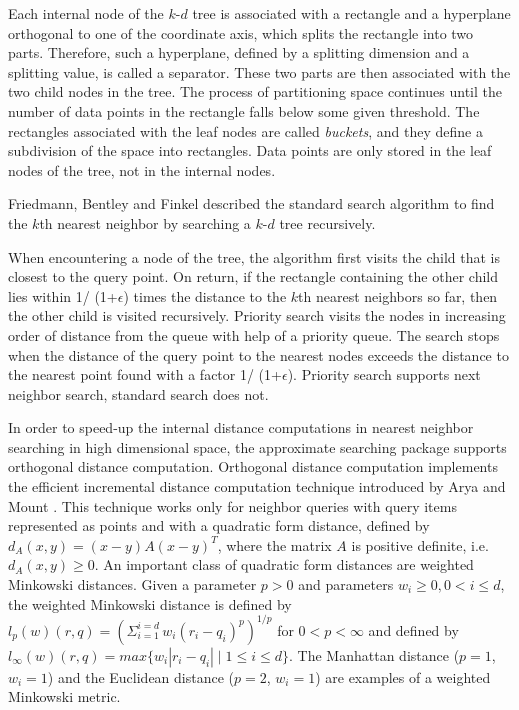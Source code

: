Each internal node of the $k$-$d$ tree is associated with a rectangle
and a hyperplane orthogonal to one of the coordinate axis, which
splits the rectangle into two parts.  Therefore, such a hyperplane,
defined by a splitting dimension and a splitting value, is called a
separator.  These two parts are then associated with the two child
nodes in the tree. The process of partitioning space continues until
the number of data points in the rectangle falls below some given
threshold. The rectangles associated with the leaf nodes are called
{\it buckets}, and they define a subdivision of the space into
rectangles.  Data points are only stored in the leaf nodes of the
tree, not in the internal nodes.

Friedmann, Bentley and Finkel \cite{fbf-afbml-77} described the
standard search algorithm to find the $k$th nearest neighbor by
searching a $k$-$d$ tree recursively.

When encountering a node of the tree, the algorithm first visits the
child that is closest to the query point. On return, if the rectangle
containing the other child lies within 1/ (1+$\epsilon$) times the
distance to the $k$th nearest neighbors so far, then the other child
is visited recursively.  Priority search \cite{am-annqf-93} visits the
nodes in increasing order of distance from the queue with help of a
priority queue.  The search stops when the distance of the query point
to the nearest nodes exceeds the distance to the nearest point found
with a factor 1/ (1+$\epsilon$).  Priority search supports next
neighbor search, standard search does not.

In order to speed-up the internal distance computations in nearest
neighbor searching in high dimensional space, the approximate
searching package supports orthogonal distance computation. Orthogonal distance
computation
implements the efficient incremental distance computation technique
introduced by Arya and Mount \cite{am-afvq-93}.  This technique
works only for neighbor queries with query items represented as points
and with a quadratic form distance, defined by $d_A(x,y)=
(x-y)A(x-y)^T$, where the matrix $A$ is positive definite,
i.e. $d_A(x,y) \geq 0$.  An important class of quadratic form
distances are weighted Minkowski distances.  Given a parameter $p>0$
and parameters $w_i \geq 0, 0 < i \leq d$, the weighted Minkowski
distance is defined by $l_p(w)(r,q)= ({\Sigma_{i=1}^{i=d} \,
w_i(r_i-q_i)^p})^{1/p}$ for $0 < p <\infty$ and defined by
$l_{\infty}(w)(r,q)=max \{w_i |r_i-q_i| \mid 1 \leq i \leq d\}$.  The
Manhattan distance ($p=1$, $w_i=1$) and the Euclidean distance ($p=2$,
$w_i=1$) are examples of a weighted Minkowski metric.

